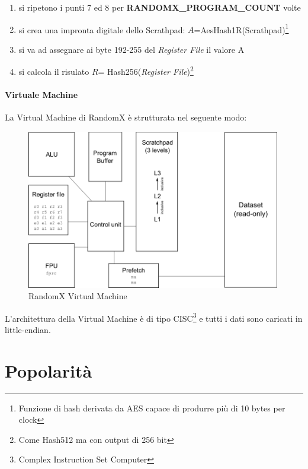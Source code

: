 \documentclass[12pt,a4paper]{article}
\begin{document}
\begin{enumerate}
    \item si ripetono i punti 7 ed 8 per \textbf{RANDOMX\_PROGRAM\_COUNT} volte
    
    \item si crea una impronta digitale dello Scrathpad:
    $A$=AesHash1R(Scrathpad)\footnote{Funzione di hash derivata da AES capace di
    produrre più di 10 bytes per clock}

    \item si va ad assegnare ai byte 192-255 del \textit{Register File} il
    valore A

    \item si calcola il risulato $ R $= Hash256(\textit{Register
    File})\footnote{Come Hash512 ma con output di 256 bit}

\end{enumerate}

\paragraph{Virtuale Machine}
La Virtual Machine di RandomX è strutturata nel seguente modo:

\begin{figure}[ht]
    \centering
    \includegraphics[width=0.99\textwidth]{./images/vm_randomX.png}
    \caption{RandomX Virtual Machine}
    \label{fig:vm_randomX}
\end{figure}

L'architettura della Virtual Machine è di tipo CISC\footnote{Complex Instruction
Set Computer} e tutti i dati sono caricati in little-endian. 

\newpage 

\section{Popolarità}
\end{document}
